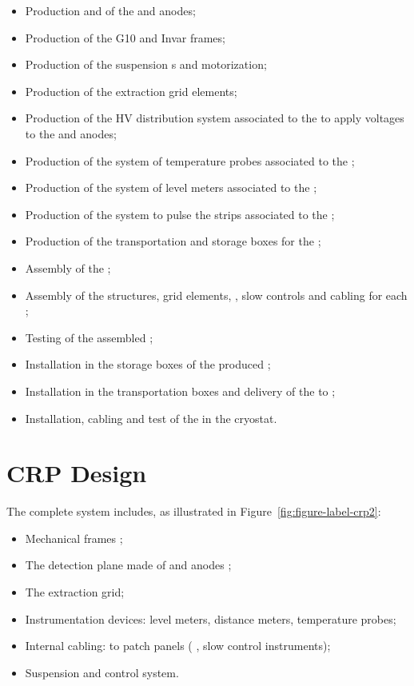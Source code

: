 \begin{itemize}
\item  Production and  of the  and anodes;
\item  Production of the G10 and Invar frames;
\item Production of the suspension \fdth{}s and motorization;
\item Production of the extraction grid elements;
\item Production of the HV distribution system associated to the  to apply voltages to the  and anodes;
\item Production of the system of temperature probes associated to the ;
\item Production of the system of level meters associated to the ;
\item Production of the system to pulse the strips associated to the ;
\item Production of the transportation and storage boxes for the ;
\item Assembly of the ;
\item Assembly of the  structures,   grid elements, , slow controls and cabling for each ;
\item Testing of the assembled ;
\item Installation in the storage boxes of the produced ;
\item Installation in the transportation boxes and delivery of the  to \surf{}; %
\item Installation, cabling and test of the  in the cryostat.
\end{itemize}


\section{CRP Design}
\label{sec:fddp-crp-design}

The complete  system includes, as illustrated in Figure~\ref{fig:figure-label-crp2}:
\begin{itemize}
\item Mechanical frames  ;
\item The detection plane made of  and anodes ;
\item The extraction grid;
\item Instrumentation devices: level meters, distance meters, temperature probes;
\item Internal cabling: to patch panels ( , slow control instruments);
\item Suspension and control system.
\end{itemize}

